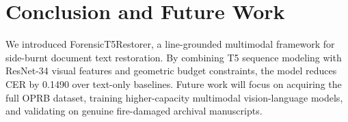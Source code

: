 \documentclass[10pt,twocolumn]{article}
\begin{document}
\section{Conclusion and Future Work}
We introduced ForensicT5Restorer, a line-grounded multimodal framework for side-burnt document text restoration. By combining T5 sequence modeling with ResNet-34 visual features and geometric budget constraints, the model reduces CER by 0.1490 over text-only baselines. Future work will focus on acquiring the full OPRB dataset, training higher-capacity multimodal vision-language models, and validating on genuine fire-damaged archival manuscripts.



\end{document}
